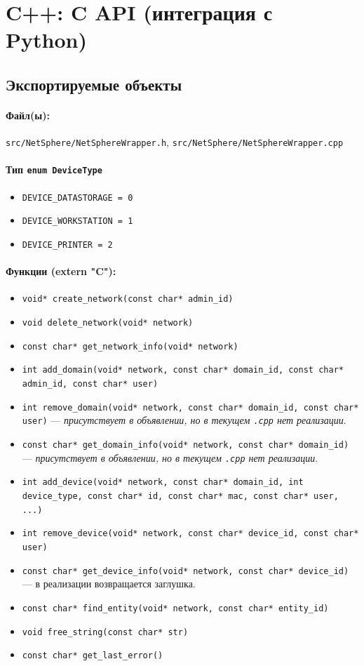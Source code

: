 \documentclass[14pt,a4paper]{extarticle}
\begin{document}
\section{C++: C API (интеграция с Python)}
\subsection{Экспортируемые объекты}
\paragraph{Файл(ы):} \texttt{src/NetSphere/NetSphereWrapper.h}, \texttt{src/NetSphere/NetSphereWrapper.cpp}
\paragraph{Тип \texttt{enum DeviceType}}
\begin{itemize}
  \item \texttt{DEVICE\_DATASTORAGE = 0}
  \item \texttt{DEVICE\_WORKSTATION = 1}
  \item \texttt{DEVICE\_PRINTER = 2}
\end{itemize}
\paragraph{Функции (extern "C"):}
\begin{itemize}
  \item \texttt{void* create\_network(const char* admin\_id)}
  \item \texttt{void delete\_network(void* network)}
  \item \texttt{const char* get\_network\_info(void* network)}
  \item \texttt{int add\_domain(void* network, const char* domain\_id, const char* admin\_id, const char* user)}
  \item \texttt{int remove\_domain(void* network, const char* domain\_id, const char* user)} --- \emph{присутствует в объявлении, но в текущем \texttt{.cpp} нет реализации}.
  \item \texttt{const char* get\_domain\_info(void* network, const char* domain\_id)} --- \emph{присутствует в объявлении, но в текущем \texttt{.cpp} нет реализации}.
  \item \texttt{int add\_device(void* network, const char* domain\_id, int device\_type, const char* id, const char* mac, const char* user, ...)}
  \item \texttt{int remove\_device(void* network, const char* device\_id, const char* user)}
  \item \texttt{const char* get\_device\_info(void* network, const char* device\_id)} --- в реализации возвращается заглушка.
  \item \texttt{const char* find\_entity(void* network, const char* entity\_id)}
  \item \texttt{void free\_string(const char* str)}
  \item \texttt{const char* get\_last\_error()}
\end{itemize}
\end{document}
